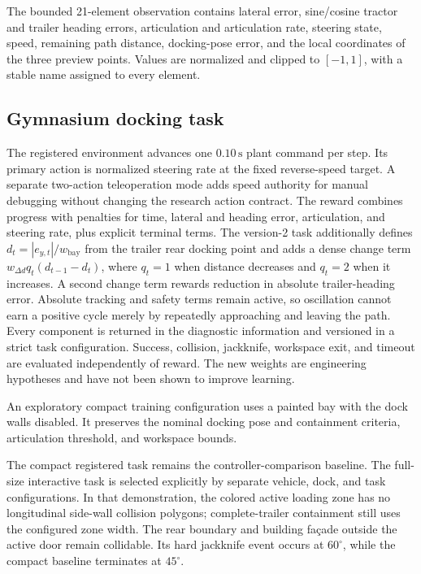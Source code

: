 The bounded 21-element observation contains lateral error, sine/cosine tractor
and trailer heading errors, articulation and articulation rate, steering state,
speed, remaining path distance, docking-pose error, and the local coordinates
of the three preview points. Values are normalized and clipped to $[-1,1]$,
with a stable name assigned to every element.

\subsection{Gymnasium docking task}

\implemented{} The registered environment advances one $0.10\,\mathrm{s}$
plant command per step. Its primary action is normalized steering rate at the
fixed reverse-speed target. A separate two-action teleoperation mode adds speed
authority for manual debugging without changing the research action contract.
The reward combines progress with penalties for time, lateral and heading
error, articulation, and steering rate, plus explicit terminal terms. The
version-2 task additionally defines $d_t=|e_{y,t}|/w_{\mathrm{bay}}$ from the
trailer rear docking point and adds a dense change term
$w_{\Delta d}q_t(d_{t-1}-d_t)$, where $q_t=1$ when distance decreases and
$q_t=2$ when it increases. A second change term rewards reduction in absolute
trailer-heading error. Absolute tracking and safety terms remain active, so
oscillation cannot earn a positive cycle merely by repeatedly approaching and
leaving the path. Every component is returned in the diagnostic information
and versioned in a strict task configuration. Success, collision, jackknife,
workspace exit, and timeout are evaluated independently of reward. The new
weights are engineering hypotheses and have not been shown to improve
learning.

An exploratory compact training configuration uses a painted bay with the
dock walls disabled. It preserves the nominal docking pose and containment
criteria, articulation threshold, and workspace bounds.

The compact registered task remains the controller-comparison baseline. The
full-size interactive task is selected explicitly by separate vehicle, dock,
and task configurations. In that demonstration, the colored active loading
zone has no longitudinal side-wall collision polygons; complete-trailer
containment still uses the configured zone width. The rear boundary and
building façade outside the active door remain collidable. Its hard jackknife
event occurs at $60^\circ$, while the compact baseline terminates at
$45^\circ$.

